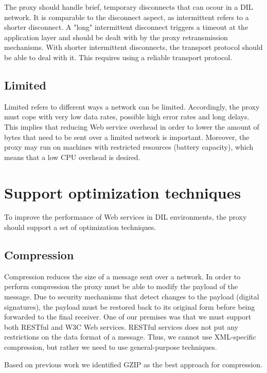The proxy should handle brief, temporary disconnects that can ocour in a DIL
network. It is comparable to the disconnect aspect, as intermittent refers to a
shorter disconnect. A "long" intermittent disconnect triggers a timeout at the
application layer and should be dealt with by the proxy retransmission
mechanisms. With shorter intermittent disconnects, the transport protocol should
be able to deal with it. This requires using a reliable transport protocol.

\subsection{Limited}

Limited refers to different ways a network can be limited. Accordingly, the
proxy must cope with very low data rates, possible high error rates and long
delays. This implies that reducing Web service overhead in order to lower the
amount of bytes that need to be sent over a limited network is important.
Moreover, the proxy may run on machines with restricted resources (battery
capacity), which means that a low CPU overhead is desired.

\section{Support optimization techniques}

To improve the performance of Web services in DIL environments, the proxy should
support a set of optimization techniques.

\subsection{Compression}

Compression reduces the size of a message sent over a network. In order to
perform compression the proxy must be able to modify the payload of the message.
Due to security mechanisms that detect changes to the payload (digital
signatures), the payload must be restored back to its original form before being
forwarded to the final receiver. One of our premises was that we must support
both RESTful and W3C Web services. RESTful services does not put any
restrictions on the data format of a message. Thus, we cannot use XML-specific
compression, but rather we need to use general-purpose techniques.

Based on previous work we identified GZIP as the best approach for compression.


